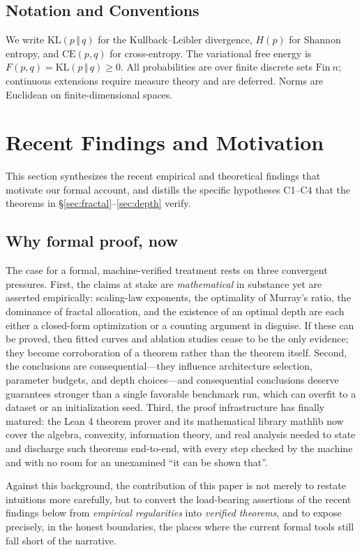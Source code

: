 \documentclass[conference]{IEEEtran}
\begin{document}
\subsection{Notation and Conventions}
We write $\mathrm{KL}(p\,\Vert\,q)$ for the Kullback--Leibler divergence,
$H(p)$ for Shannon entropy, and $\mathrm{CE}(p,q)$ for cross-entropy. The
variational free energy is $F(p,q)=\mathrm{KL}(p\,\Vert\,q)\ge0$. All
probabilities are over finite discrete sets $\mathrm{Fin}\ n$; continuous
extensions require measure theory and are deferred. Norms are Euclidean on
finite-dimensional spaces.

\section{Recent Findings and Motivation}
\label{sec:findings}
This section synthesizes the recent empirical and theoretical findings that
motivate our formal account, and distills the specific hypotheses C1--C4 that
the theorems in \S\ref{sec:fractal}--\ref{sec:depth} verify.

\subsection{Why formal proof, now}
\label{sec:why-formal}
The case for a formal, machine-verified treatment rests on three convergent
pressures. First, the claims at stake are \emph{mathematical} in substance yet
are asserted empirically: scaling-law exponents, the optimality of Murray's
ratio, the dominance of fractal allocation, and the existence of an optimal
depth are each either a closed-form optimization or a counting argument in
disguise. If these can be proved, then fitted curves and ablation studies
cease to be the only evidence; they become corroboration of a theorem rather
than the theorem itself. Second, the conclusions are consequential---they
influence architecture selection, parameter budgets, and depth choices---and
consequential conclusions deserve guarantees stronger than a single favorable
benchmark run, which can overfit to a dataset or an initialization seed. Third,
the proof infrastructure has finally matured: the Lean 4 theorem prover
\cite{lean4} and its mathematical library mathlib \cite{mathlib} now cover the
algebra, convexity, information theory, and real analysis needed to state and
discharge such theorems end-to-end, with every step checked by the machine and
with no room for an unexamined ``it can be shown that''.

Against this background, the contribution of this paper is not merely to
restate intuitions more carefully, but to convert the load-bearing assertions
of the recent findings below from \emph{empirical regularities} into
\emph{verified theorems}, and to expose precisely, in the honest boundaries, the
places where the current formal tools still fall short of the narrative.
\end{document}
